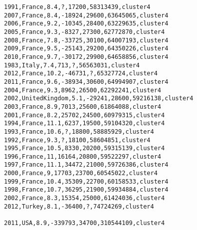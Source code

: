 \begin{lstlisting}[basicstyle=\footnotesize\ttfamily,numbers=none]
1991,France,8.4,?,17200,58313439,cluster4
2007,France,8.4,-18924,29600,63645065,cluster4
2006,France,9.2,-10345,28400,63229635,cluster4
2005,France,9.3,-8327,27300,62772870,cluster4
2008,France,7.8,-33725,30100,64007193,cluster4
2009,France,9.5,-25143,29200,64350226,cluster4
2010,France,9.7,-30172,29900,64658856,cluster4
1983,Italy,7.4,713,?,56563031,cluster4
2012,France,10.2,-46731,?,65327724,cluster4
2011,France,9.6,-38934,30600,64994907,cluster4
2004,France,9.3,8962,26500,62292241,cluster4
2002,UnitedKingdom,5.1,-29241,28600,59216138,cluster4
2003,France,8.9,7013,25600,61864088,cluster4
2001,France,8.2,25702,24500,60979315,cluster4
1994,France,11.1,6237,19500,59104320,cluster4
1993,France,10.6,?,18800,58885929,cluster4
1992,France,9.3,?,18100,58604851,cluster4
1995,France,10.5,8330,20200,59315139,cluster4
1996,France,11,16164,20800,59522297,cluster4
1997,France,11.1,34472,21000,59726386,cluster4
2000,France,9,17703,23700,60545022,cluster4
1999,France,10.4,35309,22700,60158533,cluster4
1998,France,10.7,36295,21900,59934884,cluster4
2002,France,8.3,15354,25000,61424036,cluster4
2012,Turkey,8.1,-36400,?,74724269,cluster4

2011,USA,8.9,-339793,34700,310544109,cluster4
\end{lstlisting}